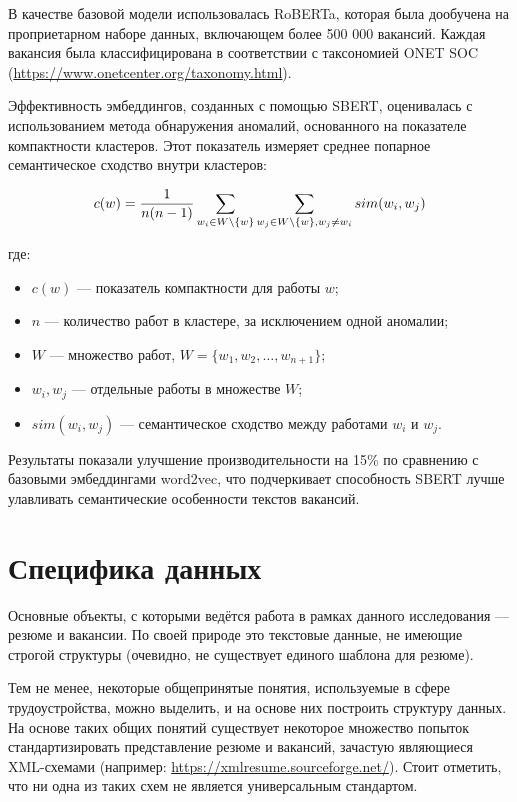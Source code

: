 \documentclass[14pt]{mmcs_article}
\begin{document}
В качестве базовой модели использовалась RoBERTa, которая была дообучена на проприетарном наборе данных, включающем более 500 000 вакансий. Каждая вакансия была классифицирована в соответствии с таксономией ONET SOC (\url{https://www.onetcenter.org/taxonomy.html}).

Эффективность эмбеддингов, созданных с помощью SBERT, оценивалась
с использованием метода обнаружения аномалий, основанного на показателе компактности кластеров. Этот показатель измеряет среднее попарное семантическое сходство внутри кластеров:

\begin{equation}
  \label{eq:compactness_cluster}
  \centering
  \allowdisplaybreaks[1]
  \begin{split}
    c(w) = \frac{1}{n(n-1)} \sum_{w_i \in W \setminus \{w\}} \sum_{w_j \in W \setminus \{w\}, w_j \neq w_i} sim(w_i, w_j)
  \end{split}
\end{equation}

где:
\begin{itemize}
  \item \( c(w) \) — показатель компактности для работы \( w \);
  \item \( n \) — количество работ в кластере, за исключением одной аномалии;
  \item \( W \) — множество работ, \( W = \{w_1, w_2, \ldots, w_{n+1}\} \);
  \item \( w_i, w_j \) — отдельные работы в множестве \( W \);
  \item \( sim(w_i, w_j) \) — семантическое сходство между работами \( w_i \) и \( w_j \).
\end{itemize}

Результаты показали улучшение производительности на 15\% по сравнению с базовыми эмбеддингами word2vec, что подчеркивает способность SBERT лучше улавливать семантические особенности текстов вакансий.


\newpage
\section{Специфика данных}\label{data_specification}

Основные объекты, с которыми ведётся работа в рамках данного исследования --- резюме и вакансии. По своей природе это текстовые данные, не имеющие строгой структуры (очевидно, не существует единого шаблона для резюме).

Тем не менее, некоторые общепринятые понятия, используемые в сфере трудоустройства, можно выделить, и на основе них построить структуру данных. На основе таких общих понятий существует некоторое множество попыток стандартизировать представление резюме и вакансий, зачастую являющиеся XML-схемами (например: \url{https://xmlresume.sourceforge.net/}). Стоит отметить, что ни одна из таких схем не является универсальным стандартом.
\end{document}
